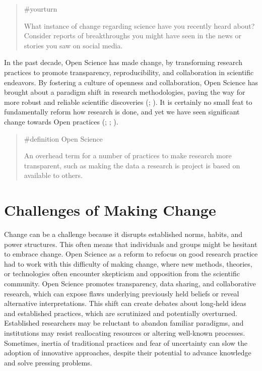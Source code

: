 \documentclass[
  letterpaper,
]{book}
\begin{document}
\begin{quote}
{\#yourturn}

What instance of change regarding science have you recently heard about?
Consider reports of breakthroughs you might have seen in the news or
stories you saw on social media.
\end{quote}

In the past decade, Open Science has made change, by transforming
research practices to promote transparency, reproducibility, and
collaboration in scientific endeavors. By fostering a culture of
openness and collaboration, Open Science has brought about a paradigm
shift in research methodologies, paving the way for more robust and
reliable scientific discoveries
(;
). It is certainly no small feat to fundamentally reform how
research is done, and yet we have seen significant change towards Open
practices (;
;
).

\begin{quote}
{\#definition} Open Science

An overhead term for a number of practices to make research more
transparent, such as making the data a research is project is based on
available to others.
\end{quote}

\section*{Challenges of Making
Change}\label{challenges-of-making-change}


Change can be a challenge because it disrupts established norms, habits,
and power structures. This often means that individuals and groups might
be hesitant to embrace change. Open Science as a reform to refocus on
good research practice had to work with this difficulty of making
change, where new methods, theories, or technologies often encounter
skepticism and opposition from the scientific community. Open Science
promotes transparency, data sharing, and collaborative research, which
can expose flaws underlying previously held beliefs or reveal
alternative interpretations. This shift can create debates about
long-held ideas and established practices, which are scrutinized and
potentially overturned. Established researchers may be reluctant to
abandon familiar paradigms, and institutions may resist reallocating
resources or altering well-known processes. Sometimes, inertia of
traditional practices and fear of uncertainty can slow the adoption of
innovative approaches, despite their potential to advance knowledge and
solve pressing problems.
\end{document}
